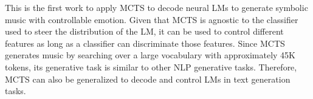 This is the first work to apply MCTS to decode neural LMs to generate symbolic music with controllable emotion. Given that MCTS is agnostic to the classifier used to steer the distribution of the LM, it can be used to control different features as long as a classifier can discriminate those features. Since MCTS generates music by searching over a large vocabulary with approximately 45K tokens, its generative task is similar to other NLP generative tasks. Therefore, MCTS can also be generalized to decode and control LMs in text generation tasks.
